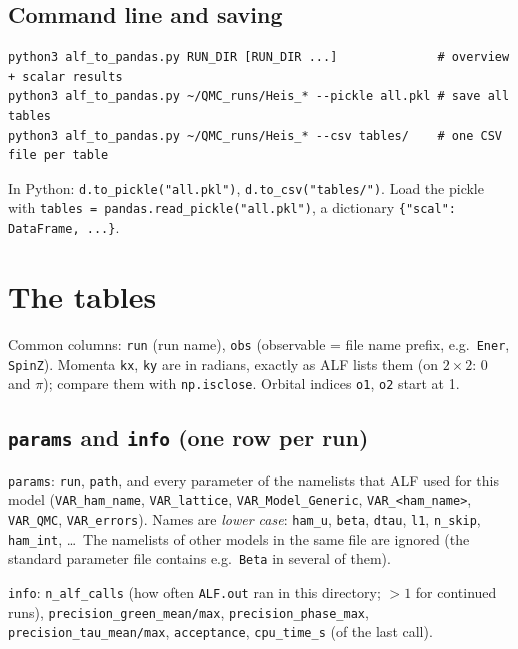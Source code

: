 \documentclass[11pt,a4paper]{article}
\newcommand{\f}[1]{\texttt{#1}}
\begin{document}
\subsection{Command line and saving}
\begin{lstlisting}
python3 alf_to_pandas.py RUN_DIR [RUN_DIR ...]              # overview + scalar results
python3 alf_to_pandas.py ~/QMC_runs/Heis_* --pickle all.pkl # save all tables
python3 alf_to_pandas.py ~/QMC_runs/Heis_* --csv tables/    # one CSV file per table
\end{lstlisting}
In Python: \f{d.to\_pickle("all.pkl")}, \f{d.to\_csv("tables/")}. Load the pickle with
\f{tables = pandas.read\_pickle("all.pkl")}, a dictionary \f{\{"scal": DataFrame, ...\}}.

\section{The tables}

Common columns: \f{run} (run name), \f{obs} (observable = file name prefix, e.g.\ \f{Ener},
\f{SpinZ}). Momenta \f{kx}, \f{ky} are in radians, exactly as ALF lists them (on $2\times2$: $0$ and
$\pi$); compare them with \f{np.isclose}. Orbital indices \f{o1}, \f{o2} start at 1.

\subsection{\texttt{params} and \texttt{info} (one row per run)}
\f{params}: \f{run}, \f{path}, and every parameter of the namelists that ALF used for this
model (\f{VAR\_ham\_name}, \f{VAR\_lattice}, \f{VAR\_Model\_Generic}, \f{VAR\_<ham\_name>},
\f{VAR\_QMC}, \f{VAR\_errors}). Names are \emph{lower case}: \f{ham\_u}, \f{beta}, \f{dtau},
\f{l1}, \f{n\_skip}, \f{ham\_int}, \dots\ The namelists of other models in the same file are
ignored (the standard parameter file contains e.g.\ \f{Beta} in several of them).

\f{info}: \f{n\_alf\_calls} (how often \f{ALF.out} ran in this directory; $>1$ for continued
runs), \f{precision\_green\_mean/max}, \f{precision\_phase\_max},
\f{precision\_tau\_mean/max}, \f{acceptance}, \f{cpu\_time\_s} (of the last call).
\end{document}
